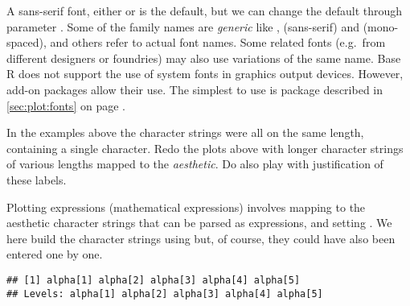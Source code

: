 \documentclass[krantz2]{krantz}\usepackage{knitr}%
\begin{document}
A sans-serif font, either  or  is the default, but we can change the default through parameter . Some of the family names are \emph{generic} like ,  (sans-serif) and  (mono-spaced), and others refer to actual font names. Some related fonts (e.g.\ from different designers or foundries) may also use variations of the same name. Base R does not support the use of system fonts in graphics output devices. However, add-on packages allow their use. The simplest to use is package  described in \ref{sec:plot:fonts} on page \pageref{sec:plot:fonts}.

\begin{knitrout}\footnotesize
{}\color{fgcolor}\begin{kframe}
\begin{alltt}
    \hlopt{+}
  \hlstd{(} \hlstd{=} \hlstd{,}  \hlstd{=} \hlstd{,}  \hlstd{=} \hlstd{,}  \hlstd{=} \hlstd{)} \hlopt{+}
  \hlstd{()}
\end{alltt}
\end{kframe}
\end{knitrout}

\begin{playground}
In the examples above the character strings were all on the same length, containing a single character. Redo the plots above with longer character strings of various lengths mapped to the  \emph{aesthetic}. Do also play with justification of these labels.
\end{playground}

Plotting expressions (mathematical expressions) involves mapping to the  aesthetic character strings that can be parsed as expressions, and setting . We here build the character strings using  but, of course, they could have also been entered one by one.

\begin{knitrout}\footnotesize
{}\color{fgcolor}\begin{kframe}
\begin{alltt}
 \hlkwb{<-}
  \hlstd{(} \hlstd{=} \hlopt{:}\hlstd{,}  \hlstd{=} \hlstd{(}\hlstd{,} \hlstd{),}
              \hlstd{=} \hlstd{(}\hlstr{"alpha["}\hlstd{,} \hlopt{:}\hlstd{,} \hlstr{"]"}\hlstd{,}  \hlstd{=} \hlstd{))}
\hlopt{$}
\end{alltt}
\begin{verbatim}
## [1] alpha[1] alpha[2] alpha[3] alpha[4] alpha[5]
## Levels: alpha[1] alpha[2] alpha[3] alpha[4] alpha[5]
\end{verbatim}
\end{kframe}
\end{knitrout}
\end{document}
